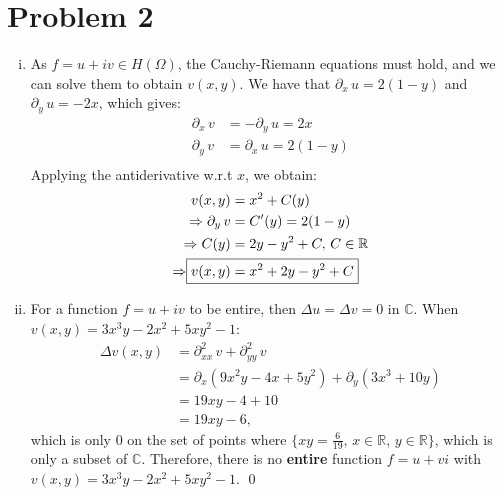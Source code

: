 \documentclass[a4paper, titlepage, DIV=14]{scrartcl}
\begin{document}
    \section*{Problem 2}
    \begin{enumerate}[(i)]
        \item As $f=u+iv \in H(\Omega)$, the Cauchy-Riemann equations must hold, and we can solve them to 
        obtain $v(x,y)$. We have that $\partial_{x} \, u = 2(1-y)$ and $\partial_{y} \, u = -2x$, which gives:
        \begin{align*}
            \partial_{x} \, v &= -\partial_{y} \, u = 2x \\
            \partial_{y} \, v &= \partial_{x} \, u = 2(1-y) \\
        \end{align*}
        Applying the antiderivative w.r.t $x$, we obtain:
        \begin{align*}
            v(x,y) &= x^{2} + C(y) \\
            \Rightarrow \partial_{y} \, v &= C'(y) = 2(1-y) \\
            \Rightarrow C(y) &= 2y - y^{2} + C, \, C\in \mathbb{R}  \\
            \Rightarrow \Aboxed{ v(x,y) &= x^{2} + 2y - y^{2} + C }
        \end{align*}
        
        \item For a function $f=u+iv$ to be entire, then $\Delta u = \Delta v = 0$ in $\mathbb{C}$. When 
        $v(x,y) = 3x^{3}y - 2x^{2} + 5xy^{2} - 1$:
        \begin{align*}
            \Delta v(x,y) &= \partial^{2}_{xx} \, v + \partial^{2}_{yy} \, v \\
                &= \partial_{x}(9x^{2}y-4x+5y^{2}) + \partial_{y}(3x^{3}+10y) \\
                &= 19xy - 4 + 10 \\
                &= 19xy - 6,
        \end{align*} which is only $0$ on the set of points where $\{xy = \frac{6}{19}, \, x \in \mathbb{R}, 
            \, y \in \mathbb{R}\}$, which is only a subset of $\mathbb{C}$. Therefore, there is no \textbf{entire} 
        function $f=u+vi$ with $v(x,y)=3x^{3}y - 2x^{2} + 5xy^{2} - 1$. \qed
    \end{enumerate}
\end{document}
